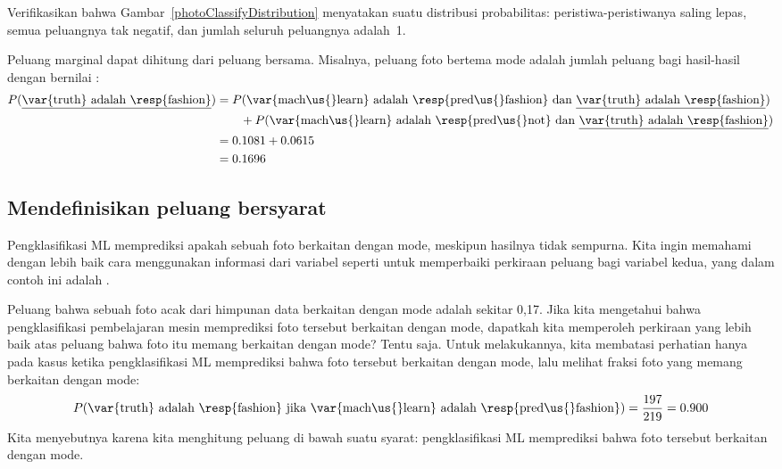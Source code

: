 \D{\newpage}

\begin{exercisewrap}
\begin{nexercise}
Verifikasikan bahwa Gambar~\ref{photoClassifyDistribution} menyatakan
suatu distribusi probabilitas: peristiwa-peristiwanya saling lepas,
semua peluangnya tak negatif, dan jumlah seluruh peluangnya
adalah~1.\footnotemark
\end{nexercise}
\end{exercisewrap}

Peluang marginal dapat dihitung dari peluang bersama.
Misalnya, peluang foto bertema mode adalah jumlah peluang bagi
hasil-hasil dengan  bernilai :%
\newcommand{\ultruthfashion}[0]
    {\underline{\var{truth} adalah \resp{fashion}}}%
\begin{align*}
P(\text{\ultruthfashion{}})
  &= P(\text{\var{mach\us{}learn} adalah \resp{pred\us{}fashion}
        dan \ultruthfashion{}}) \\
    & \qquad + P(\text{\var{mach\us{}learn} adalah \resp{pred\us{}not}
        dan \ultruthfashion{}}) \\
  &= 0.1081 + 0.0615 \\
  &= 0.1696
\end{align*}


\subsection{Mendefinisikan peluang bersyarat}


Pengklasifikasi ML memprediksi apakah sebuah foto berkaitan dengan mode,
meskipun hasilnya tidak sempurna.
Kita ingin memahami dengan lebih baik cara menggunakan informasi
dari variabel seperti  untuk memperbaiki
perkiraan peluang bagi variabel kedua, yang dalam contoh ini
adalah .

Peluang bahwa sebuah foto acak dari himpunan data berkaitan dengan
mode adalah sekitar 0,17.
Jika kita mengetahui bahwa pengklasifikasi pembelajaran mesin memprediksi
foto tersebut berkaitan dengan mode, dapatkah kita memperoleh perkiraan yang lebih baik
atas peluang bahwa foto itu memang berkaitan dengan mode?
Tentu saja.
Untuk melakukannya, kita membatasi perhatian hanya pada \fashYA{} kasus
ketika pengklasifikasi ML memprediksi bahwa foto tersebut berkaitan dengan
mode, lalu melihat fraksi foto yang memang berkaitan
dengan mode:
\begin{align*}
P(\text{\var{truth} adalah \resp{fashion} jika
    \var{mach\us{}learn} adalah \resp{pred\us{}fashion}})
  = \frac{\fashYY{}}{\fashYA{}}
  = 0.900
\end{align*}
Kita menyebutnya  karena
kita menghitung peluang di bawah suatu syarat:
pengklasifikasi ML memprediksi bahwa foto tersebut berkaitan dengan mode.

